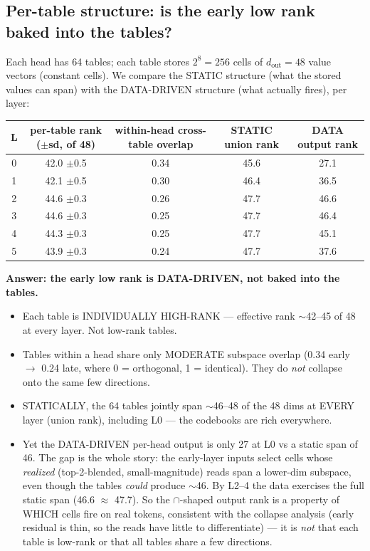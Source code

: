 \documentclass[11pt]{article}
\begin{document}
\subsection{Per-table structure: is the early low rank baked into the tables?}
Each head has 64 tables; each table stores $2^{8}{=}256$ cells of $d_{\text{out}}{=}48$ value vectors (constant cells).
We compare the STATIC structure (what the stored values can span) with the DATA-DRIVEN structure (what actually fires),
per layer:

\begin{center}\small
\begin{tabular}{c|c|c|c|c}
L & per-table rank ($\pm$sd, of 48) & within-head cross-table overlap & STATIC union rank & DATA output rank \\ \hline
0 & 42.0 $\pm$0.5 & 0.34 & 45.6 & 27.1 \\
1 & 42.1 $\pm$0.5 & 0.30 & 46.4 & 36.5 \\
2 & 44.6 $\pm$0.3 & 0.26 & 47.7 & 46.6 \\
3 & 44.6 $\pm$0.3 & 0.25 & 47.7 & 46.4 \\
4 & 44.3 $\pm$0.3 & 0.25 & 47.7 & 45.1 \\
5 & 43.9 $\pm$0.3 & 0.24 & 47.7 & 37.6 \\
\end{tabular}
\end{center}

\textbf{Answer: the early low rank is DATA-DRIVEN, not baked into the tables.}
\begin{itemize}
\item Each table is INDIVIDUALLY HIGH-RANK --- effective rank $\sim$42--45 of 48 at every layer. Not low-rank tables.
\item Tables within a head share only MODERATE subspace overlap (0.34 early $\to$ 0.24 late, where 0 = orthogonal, 1 =
identical). They do \emph{not} collapse onto the same few directions.
\item STATICALLY, the 64 tables jointly span $\sim$46--48 of the 48 dims at EVERY layer (union rank), including L0 --- the
codebooks are rich everywhere.
\item Yet the DATA-DRIVEN per-head output is only 27 at L0 vs a static span of 46. The gap is the whole story: the early-layer
inputs select cells whose \emph{realized} (top-2-blended, small-magnitude) reads span a lower-dim subspace, even though the tables
\emph{could} produce $\sim$46. By L2--4 the data exercises the full static span (46.6 $\approx$ 47.7). So the $\cap$-shaped output
rank is a property of WHICH cells fire on real tokens, consistent with the collapse analysis (early residual is thin, so the reads
have little to differentiate) --- it is \emph{not} that each table is low-rank or that all tables share a few directions.
\end{itemize}
\end{document}

